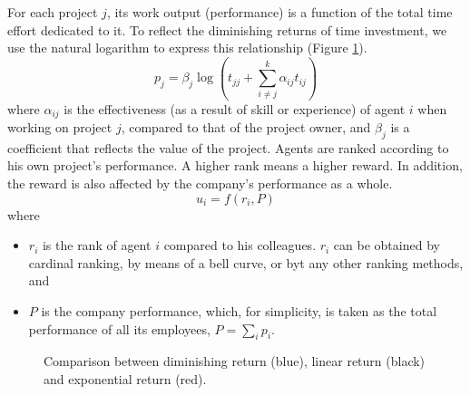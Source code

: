 \documentclass[11pt, a4paper]{article}
\begin{document}
	For each project $j$, its work output (performance) is a function of the total time effort dedicated to it. To reflect the diminishing returns of time investment, we use the natural logarithm to express this relationship (Figure \ref{fig:log}).
	\begin{equation}\label{eq:pj}
		p_j = \beta_j\log\left(t_{jj}+\sum_{i\neq j}^{k}\alpha_{ij}t_{ij}\right)
	\end{equation}
	where $\alpha_{ij}$ is the effectiveness (as a result of skill or experience) of agent $i$ when working on project $j$, compared to that of the project owner, and $\beta_{j}$ is a coefficient that reflects the value of the project. Agents are ranked according to his own project's performance. A higher rank means a higher reward. In addition, the reward is also affected by the company's performance as a whole.	
	\begin{equation}\label{eq:ui}
		u_i=f(r_i, P)
	\end{equation}
	where 
	\begin{itemize}
		\item $r_i$ is the rank of agent $i$ compared to his colleagues. $r_i$ can be obtained by cardinal ranking, by means of a bell curve, or byt any other ranking methods, and
		\item $P$ is the company performance, which, for simplicity, is taken as the total performance of all its employees, $P=\sum_{i}p_i$. 
	\end{itemize}
	\begin{figure}
		\centering
		\caption{Comparison between diminishing return (blue), linear return (black) and exponential return (red).}\label{fig:log}
	\end{figure}
\end{document}
